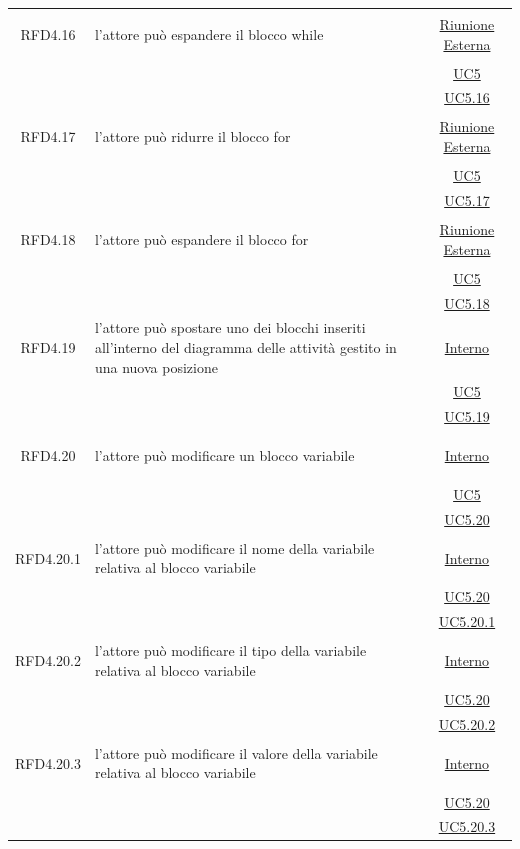 \begin{longtable}{|c|>{\centering}m{7cm}|c|}
\hypertarget{RFD4.16}{RFD4.16} & l'attore può espandere il blocco while & \hyperlink{Riunione Esterna}{Riunione Esterna}\\
& &\hyperref[UC5]{UC5}\\
& &\hyperref[UC5.16]{UC5.16}\\ \hline

\hypertarget{RFD4.17}{RFD4.17} & l'attore può ridurre il blocco for & \hyperlink{Riunione Esterna}{Riunione Esterna}\\
& &\hyperref[UC5]{UC5}\\
& & \hyperref[UC5.17]{UC5.17}\\ \hline

\hypertarget{RFD4.18}{RFD4.18} & l'attore può espandere il blocco for &  \hyperlink{Riunione Esterna}{Riunione Esterna}\\
& &\hyperref[UC5]{UC5}\\
& &\hyperref[UC5.18]{UC5.18}\\ \hline

\hypertarget{RFD4.19}{RFD4.19} & l'attore può spostare uno dei blocchi inseriti all'interno del diagramma delle attività gestito in una nuova posizione &  \hyperlink{Interno}{Interno}\\
& &\hyperref[UC5]{UC5}\\
& &\hyperref[UC5.19]{UC5.19}\\ \hline

\hypertarget{RFD4.20}{RFD4.20} & l'attore può modificare un blocco variabile &  \hyperlink{Interno}{Interno}\\
& &\hyperref[UC5]{UC5}\\
& &\hyperref[UC5.20]{UC5.20}\\ \hline

\hypertarget{RFD4.20.1}{RFD4.20.1} & l'attore può modificare il nome della variabile relativa al blocco variabile &  \hyperlink{Interno}{Interno}\\
& &\hyperref[UC5.20]{UC5.20}\\
& &\hyperref[UC5.20.1]{UC5.20.1}\\ \hline

\hypertarget{RFD4.20.2}{RFD4.20.2} & l'attore può modificare il tipo della variabile relativa al blocco variabile &  \hyperlink{Interno}{Interno}\\
& &\hyperref[UC5.20]{UC5.20}\\
& &\hyperref[UC5.20.2]{UC5.20.2}\\ \hline

\hypertarget{RFD4.20.3}{RFD4.20.3} & l'attore può modificare il valore della variabile relativa al blocco variabile &  \hyperlink{Interno}{Interno}\\
& &\hyperref[UC5.20]{UC5.20}\\
& &\hyperref[UC5.20.3]{UC5.20.3}\\ \hline


\end{longtable}
